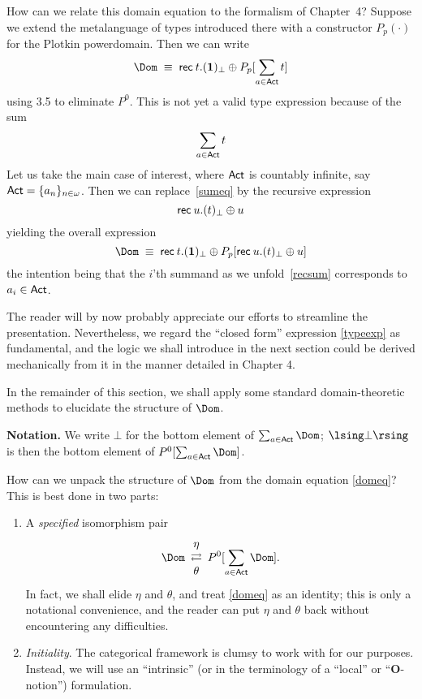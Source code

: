 How can we relate this domain equation to the formalism of Chapter~4?
Suppose we extend the metalanguage of types introduced there with a
constructor $P_{p}( \cdot )$ for the Plotkin powerdomain.
Then we can write
\[ \Dom \; \equiv \; {\sf rec} \: t . ({\bf 1})_{\bot} \oplus P_{p}[\sum_{a \in {\sf Act}}
t] \]
using 3.5 to eliminate $P^0$.
This is not yet a valid type expression because of the sum
\begin{equation}
\sum_{a \in {\sf Act}} t \label{sumeq}
\end{equation}
Let us take the main case of interest, where ${\sf Act}$ is countably infinite,
say ${\sf Act} = \{ a_{n} \}_{n \in \omega}$.
Then we can replace~\ref{sumeq} by the recursive expression
\begin{equation}
{\sf rec} \: u . (t)_{\bot} \oplus u  \label{recsum} 
\end{equation}
yielding the overall expression
\begin{equation}
\Dom \; \equiv \; {\sf rec} \: t. ({\bf 1})_{\bot} \oplus P_{p}[{\sf rec} \: u . (t)_{\bot}
\oplus u  ]  \label{typeexp} 
\end{equation}
the intention being that the $i$'th summand as we unfold~\ref{recsum}
corresponds to $a_{i} \in {\sf Act}$.

The reader will by now probably appreciate our efforts to streamline the
presentation.
Nevertheless, we regard the ``closed form'' expression \ref{typeexp} as
fundamental, and the logic we shall introduce in the next section could be
derived mechanically from it in the manner detailed in Chapter 4.

In the remainder of this section, we shall apply some standard
domain-theoretic methods to elucidate the structure of $\Dom$.

{\bf Notation.} We write $\bot$ for the bottom element of
$\sum_{a \in {\sf Act}} \Dom$; $\lsing \bot \rsing$ is then the bottom element
of $ P^{0}[ \sum_{a \in {\sf Act}} \Dom ]$.

How can we unpack the structure of $\Dom$ from the domain equation
\ref{domeq}?
This is best done in two parts:
\begin{enumerate}
\item A {\em specified} isomorphism pair
\[ \Dom \begin{array}{c}
\eta \\
\rightleftarrows \\
\theta
\end{array} P^{0}[ \sum_{a \in {\sf Act}} \Dom ] . \]
In fact, we shall elide $\eta$ and $\theta$, and treat \ref{domeq} as an
identity; this is only a notational convenience, and the reader can put
$\eta$ and $\theta$ back without encountering any difficulties.

\item {\em Initiality}. The categorical framework is clumsy to work with
for our purposes.
Instead, we will use an ``intrinsic'' (or in the terminology of
\cite{SP82} a ``local'' or ``{\bf O}-notion'') formulation.
\end{enumerate}

